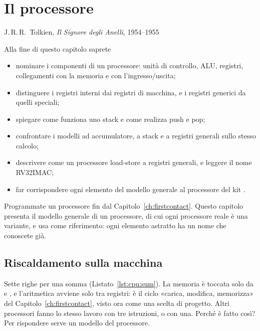 \chapter{Il processore}
\label{ch:processor}

  {J.\,R.\,R.\ Tolkien, \emph{Il Signore degli Anelli}, 1954--1955}

\begin{chapgoals}
Alla fine di questo capitolo saprete
\begin{itemize}
\item nominare i componenti di un processore: unità di controllo, ALU, registri, collegamenti con la memoria e con l'ingresso/uscita;
\item distinguere i registri interni dai registri di macchina, e i registri generici da quelli speciali;
\item spiegare come funziona uno stack e come \riscv realizza push e pop;
\item confrontare i modelli ad accumulatore, a stack e a registri generali sullo stesso calcolo;
\item descrivere \riscv come un processore load-store a registri generali, e leggere il nome RV32IMAC;
\item far corrispondere ogni elemento del modello generale al processore del kit \prg.
\end{itemize}
\end{chapgoals}


Programmate un processore fin dal Capitolo~\ref{ch:firstcontact}. Questo
capitolo presenta il modello generale di un processore, di cui ogni processore
reale è una variante, e usa \riscv come riferimento: ogni elemento astratto ha
un nome che conoscete già.

\section{Riscaldamento sulla macchina}


Sette righe per una somma (Listato~\ref{lst:cpu:sum}). La memoria è toccata
solo da  e , e l'aritmetica avviene solo tra registri: è il
ciclo «carica, modifica, memorizza» del Capitolo~\ref{ch:firstcontact}, visto
ora come una scelta di progetto. Altri processori fanno lo stesso lavoro con
tre istruzioni, o con una. Perché \riscv è fatto così? Per rispondere serve un
modello del processore.

